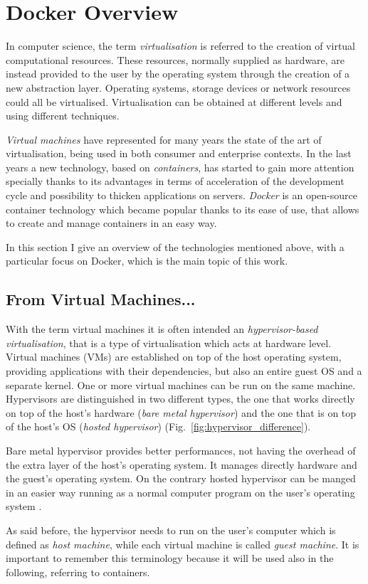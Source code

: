\documentclass[a4paper,12pt]{article}
\def\myfig#1{Fig.~#1\xspace}
\begin{document}
\newpage

\section{Docker Overview}
\label{sec:docker_overview}

In computer science, the term \textit{virtualisation}
\cite{wikipedia_virtualization} is referred to the creation of virtual
computational resources. These resources, normally supplied as hardware, are
instead provided to the user by the operating system through the creation of a
new abstraction layer. Operating systems, storage devices or network resources
could all be virtualised. Virtualisation can be obtained at different levels and
using different techniques. \par\textit{Virtual machines} have represented for
many years the state of the art of virtualisation, being used in both consumer
and enterprise contexts. In the last years a new technology, based on
\textit{containers}, has started to gain more attention specially thanks to its
advantages in terms of acceleration of the development cycle and possibility to
thicken applications on servers. \textit{Docker} is an open-source container
technology which became popular thanks to its ease of use, that allows to
create and manage containers in an easy way. \par In this section I give an
overview of the technologies mentioned above, with a particular focus on Docker,
which is the main topic of this work.

\subsection{From Virtual Machines...}

With the term virtual machines it is often intended an \textit{hypervisor-based
virtualisation}, that is a type of virtualisation which acts at hardware level.
Virtual machines (VMs) are established on top of the host operating system,
providing applications with their dependencies, but also an entire guest OS and
a separate kernel. One or more virtual machines can be run on the same machine.
Hypervisors are distinguished in two different types, the one that works
directly on top of the host's hardware (\textit{bare metal hypervisor}) and the
one that is on top of the host's OS (\textit{hosted hypervisor})
(\myfig{\ref{fig:hypervisor_difference}}). \par Bare metal hypervisor provides
better performances, not having the overhead of the extra layer of the host's
operating system. It manages directly hardware and the guest's operating system.
On the contrary hosted hypervisor can be manged in an easier way running as a
normal computer program on the user's operating
system \cite{bui_docker_security}. \par As said before, the hypervisor needs to
run on the user's computer which is defined as \textit{host machine}, while each
virtual machine is called \textit{guest machine}. It is important to remember
this terminology because it will be used also in the following, referring to
containers. 
\end{document}
